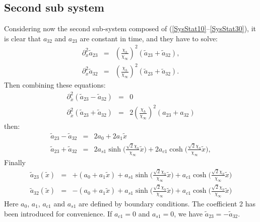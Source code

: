 \documentclass[
10pt, %
a4paper, %
oneside, %
headinclude,footinclude, %
table
]{scrartcl}
\begin{document}
\subsection{Second sub system}
Considering now the second sub-system composed of (\ref{SysStat10}--\ref{SysStat30}), it is clear that $a_{32}$ and $a_{23}$ are constant in time, and they have to solve:
$$
\begin{array}{rcl}
\partial_{x}^2\tilde{a}_{23}&=&(\frac{\chi _{h}}{\chi_{\infty}})^2\left(\tilde{a}_{23}+\tilde{a}_{32}\right),\\   
\partial_{x}^2\tilde{a}_{32}&=&(\frac{\chi _{h}}{\chi_{\infty}})^2\left(\tilde{a}_{23}+\tilde{a}_{32}\right).
\end{array}
$$
Then combining these equations:
\begin{equation}
\begin{array}{rcl}
\partial_{\tilde{x}}^2(\tilde{a}_{23}-\tilde{a}_{32})&=&0\\
\partial_{\tilde{x}}^2(\tilde{a}_{23}+\tilde{a}_{32})&=&2(\frac{\chi_{h}}{\chi_{\infty}})^2\left(a_{23}+a_{32}\right)
\end{array}
\end{equation}
then: 
\begin{equation}
\begin{array}{rcl}
\tilde{a}_{23}-\tilde{a}_{32}&=&2a_{0}+2a_{1}\tilde{x}
\\
\tilde{a}_{23}+\tilde{a}_{32}&=&2a_{s1}\sinh{(\frac{\sqrt{2}\chi_{h}}{\chi_{\infty}}\tilde{x}})+2a_{c1}\cosh{(\frac{\sqrt{2}\chi_{h}}{\chi_{\infty}}\tilde{x}}),
\end{array}
\end{equation}
Finally
\begin{equation}
\begin{array}{rcl}
\tilde{a}_{23}(\tilde{x})&=&+(a_{0}+a_{1}\tilde{x})+a_{s1}\sinh{(\frac{\sqrt{2}\chi_{h}}{\chi_{\infty}}\tilde{x}})+a_{c1}\cosh{(\frac{\sqrt{2}\chi_{h}}{\chi_{\infty}}\tilde{x}})
\\
\tilde{a}_{32}(\tilde{x})&=&-(a_{0}+a_{1}\tilde{x})+a_{s1}\sinh{(\frac{\sqrt{2}\chi_{h}}{\chi_{\infty}}\tilde{x}})+a_{c1}\cosh{(\frac{\sqrt{2}\chi_{h}}{\chi_{\infty}}\tilde{x}})
\end{array}
\end{equation}
Here $a_{0}$, $a_{1}$, $a_{c1}$ and $a_{s1}$ are defined by boundary conditions. The coefficient 2 has been introduced for convenience.  If $a_{c1}=0$ and $a_{s1}=0$, we have $\tilde{a}_{23}=-\tilde{a}_{32}$. 
\end{document}

